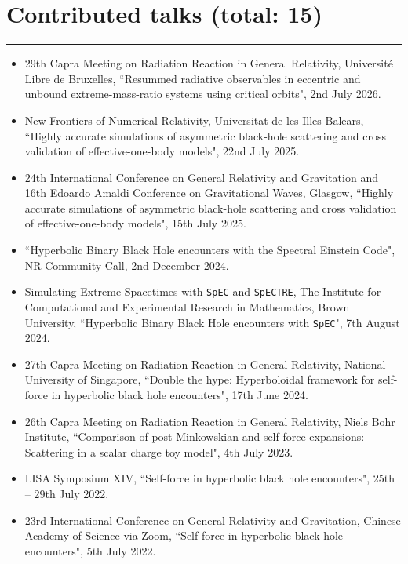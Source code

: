 \documentclass[10.5pt, oneside]{article}   	%
\begin{document}
 {\color{Sectioncolour}
\section*{Contributed talks {\rm (total: 15)}}
\vspace{-3mm}
\noindent\rule{\linewidth}{0.6pt}}
\begin{itemize}
\item 29th Capra Meeting on Radiation Reaction in General Relativity, Université Libre de Bruxelles, ``Resummed radiative observables in eccentric and unbound extreme-mass-ratio systems using critical orbits", 2nd July 2026.
\item New Frontiers of Numerical Relativity, Universitat de les Illes Balears, ``Highly accurate simulations of asymmetric black-hole scattering and cross validation of effective-one-body models", 22nd July 2025.
\item 24th International Conference on General Relativity and Gravitation and 16th Edoardo Amaldi Conference on Gravitational Waves, Glasgow, ``Highly accurate simulations of asymmetric black-hole scattering and cross validation of effective-one-body models", 15th July 2025.
\item ``Hyperbolic Binary Black Hole encounters with the Spectral Einstein Code", NR Community Call, 2nd December 2024.
\item Simulating Extreme Spacetimes with \texttt{SpEC} and \texttt{SpECTRE}, The Institute for Computational and Experimental Research in Mathematics, Brown University, ``Hyperbolic Binary Black Hole encounters with \texttt{SpEC}", 7th August 2024.
\item 27th Capra Meeting on Radiation Reaction in General Relativity, National University of Singapore, ``Double the hype: Hyperboloidal framework for self-force in hyperbolic black hole encounters", 17th June 2024.
\item 26th Capra Meeting on Radiation Reaction in General Relativity, Niels Bohr Institute, ``Comparison of post-Minkowskian and self-force expansions: Scattering in a scalar charge toy model", 4th July 2023.
\item LISA Symposium XIV, ``Self-force in hyperbolic black hole encounters", 25th -- 29th July 2022. \href{https://www.youtube.com/watch?v=p2-RgYB6Jhk}{}
\item 23rd International Conference on General Relativity and Gravitation, Chinese Academy of Science via Zoom, ``Self-force in hyperbolic black hole encounters", 5th July 2022. \href{https://www.koushare.com/video/videodetail/30159}{}

\end{itemize}
\end{document}
